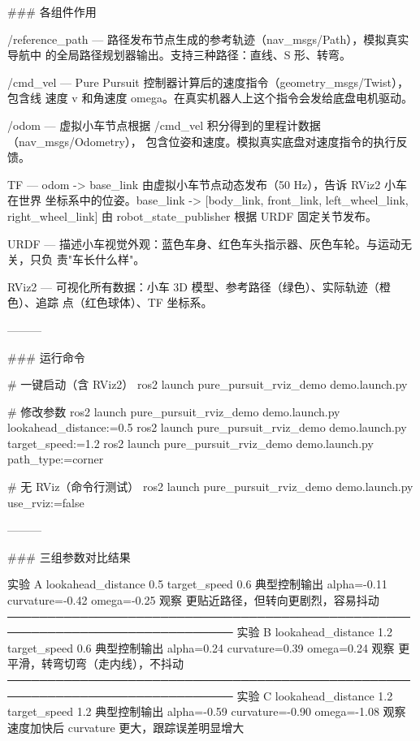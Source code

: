 \documentclass[a4paper,12pt]{book}
\begin{document}
{  ### 各组件作用

  /reference\_path — 路径发布节点生成的参考轨迹（nav\_msgs/Path），模拟真实导航中
  的全局路径规划器输出。支持三种路径：直线、S 形、转弯。

  /cmd\_vel — Pure Pursuit 控制器计算后的速度指令（geometry\_msgs/Twist），包含线
  速度 v 和角速度 omega。在真实机器人上这个指令会发给底盘电机驱动。

  /odom — 虚拟小车节点根据 /cmd\_vel 积分得到的里程计数据（nav\_msgs/Odometry），
  包含位姿和速度。模拟真实底盘对速度指令的执行反馈。

  TF — odom -> base\_link 由虚拟小车节点动态发布（50 Hz），告诉 RViz2 小车在世界
  坐标系中的位姿。base\_link -> [body\_link, front\_link, left\_wheel\_link,
  right\_wheel\_link] 由 robot\_state\_publisher 根据 URDF 固定关节发布。

  URDF — 描述小车视觉外观：蓝色车身、红色车头指示器、灰色车轮。与运动无关，只负
  责"车长什么样"。

  RViz2 — 可视化所有数据：小车 3D 模型、参考路径（绿色）、实际轨迹（橙色）、追踪
  点（红色球体）、TF 坐标系。

  ———

  ### 运行命令

  # 一键启动（含 RViz2）
  ros2 launch pure\_pursuit\_rviz\_demo demo.launch.py

  # 修改参数
  ros2 launch pure\_pursuit\_rviz\_demo demo.launch.py lookahead\_distance:=0.5
  ros2 launch pure\_pursuit\_rviz\_demo demo.launch.py target\_speed:=1.2
  ros2 launch pure\_pursuit\_rviz\_demo demo.launch.py path\_type:=corner

  # 无 RViz（命令行测试）
  ros2 launch pure\_pursuit\_rviz\_demo demo.launch.py use\_rviz:=false

  ———

  ### 三组参数对比结果

   实验                A
   lookahead\_distance  0.5
   target\_speed        0.6
   典型控制输出        alpha=-0.11 curvature=-0.42 omega=-0.25
   观察                更贴近路径，但转向更剧烈，容易抖动
  ──────────────────────────────────────────────────────────────────────────────
   实验                B
   lookahead\_distance  1.2
   target\_speed        0.6
   典型控制输出        alpha=0.24 curvature=0.39 omega=0.24
   观察                更平滑，转弯切弯（走内线），不抖动
  ──────────────────────────────────────────────────────────────────────────────
   实验                C
   lookahead\_distance  1.2
   target\_speed        1.2
   典型控制输出        alpha=-0.59 curvature=-0.90 omega=-1.08
   观察                速度加快后 curvature 更大，跟踪误差明显增大

}
\end{document}
